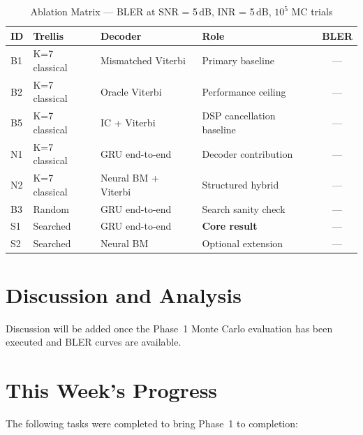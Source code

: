\documentclass[11pt,a4paper]{article}
\begin{document}
\begin{table}[h]
\centering
\caption{Ablation Matrix --- BLER at SNR = 5\,dB, INR = 5\,dB, $10^5$ MC trials}
\label{tab:ablation}
\begin{tabular}{@{}llllc@{}}
\toprule
\textbf{ID} & \textbf{Trellis} & \textbf{Decoder} & \textbf{Role} & \textbf{BLER} \\
\midrule
B1 & K=7 classical & Mismatched Viterbi  & Primary baseline          & --- \\
B2 & K=7 classical & Oracle Viterbi      & Performance ceiling       & --- \\
B5 & K=7 classical & IC + Viterbi        & DSP cancellation baseline & --- \\
N1 & K=7 classical & GRU end-to-end      & Decoder contribution      & --- \\
N2 & K=7 classical & Neural BM + Viterbi & Structured hybrid         & --- \\
B3 & Random         & GRU end-to-end     & Search sanity check       & --- \\
S1 & Searched       & GRU end-to-end     & \textbf{Core result}      & --- \\
S2 & Searched       & Neural BM          & Optional extension        & --- \\
\bottomrule
\end{tabular}
\end{table}

\section{Discussion and Analysis}

Discussion will be added once the Phase~1 Monte Carlo evaluation has been executed and BLER curves are available.

\section{This Week's Progress}

The following tasks were completed to bring Phase~1 to completion:
\end{document}
